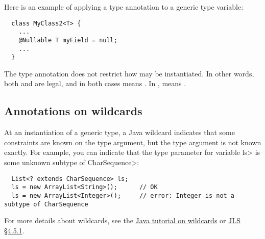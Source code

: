 Here is an example of applying a type annotation to a generic type
variable:

\begin{Verbatim}
  class MyClass2<T> {
    ...
    @Nullable T myField = null;
    ...
  }
\end{Verbatim}

\noindent
The type annotation does not restrict how  may be
instantiated.  In other words, both
 and  are
legal, and in both cases  means .
In ,
 means .





\subsection{Annotations on wildcards\label{annotations-on-wildcards}}

At an instantiation of a generic type, a Java wildcard indicates that some
constraints are known on the type argument, but the type argument is not known
exactly.
For example, you can indicate that the type parameter for variable \<ls> is
some unknown subtype of \<CharSequence>:

\begin{Verbatim}
  List<? extends CharSequence> ls;
  ls = new ArrayList<String>();      // OK
  ls = new ArrayList<Integer>();     // error: Integer is not a subtype of CharSequence
\end{Verbatim}

For more details about wildcards, see the
\href{https://docs.oracle.com/javase/tutorial/java/generics/wildcards.html}{Java
  tutorial on wildcards} or
\href{https://docs.oracle.com/javase/specs/jls/se8/html/jls-4.html#jls-4.5.1}{JLS
  \S 4.5.1}.

